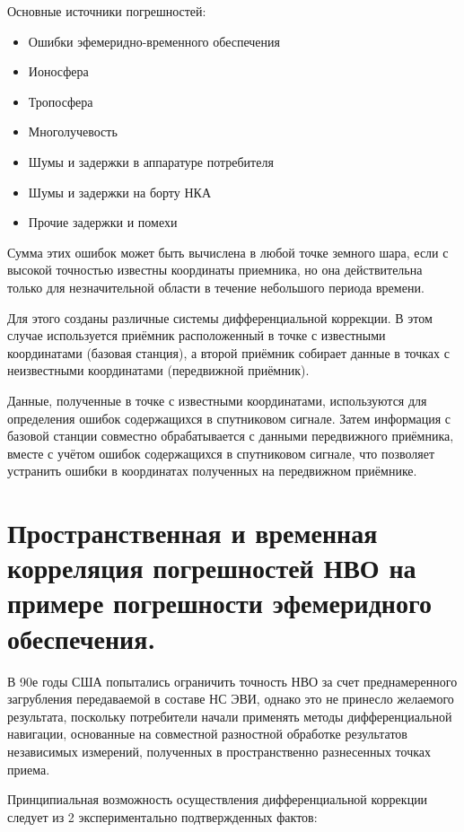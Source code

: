 \documentclass[14pt,a4paper,oneside]{extarticle}
\begin{document}
Основные источники погрешностей:

\begin{itemize}
    \item Ошибки эфемеридно-временного обеспечения
    \item Ионосфера
    \item Тропосфера
    \item Многолучевость
    \item Шумы и задержки в аппаратуре потребителя
    \item Шумы и задержки на борту НКА
    \item Прочие задержки и помехи
\end{itemize}

Сумма этих ошибок может быть вычислена в любой точке земного шара, если с высокой точностью известны координаты приемника, но она действительна только для незначительной области в течение небольшого периода времени.

Для этого созданы различные системы дифференциальной коррекции. В этом случае используется приёмник расположенный в точке с известными координатами (базовая станция), а второй приёмник собирает данные в точках с неизвестными координатами (передвижной приёмник).

Данные, полученные в точке с известными координатами, используются для определения ошибок содержащихся в спутниковом сигнале. Затем информация с базовой станции совместно обрабатывается с данными передвижного приёмника, вместе с учётом ошибок содержащихся в спутниковом сигнале, что позволяет устранить ошибки в координатах полученных на передвижном приёмнике.

\section{Пространственная и временная корреляция погрешностей НВО на примере погрешности эфемеридного обеспечения.}

В 90е годы США попытались ограничить точность НВО за счет преднамеренного загрубления передаваемой в составе НС ЭВИ, однако это не принесло желаемого результата, поскольку потребители начали применять методы дифференциальной навигации, основанные на совместной разностной обработке результатов независимых измерений, полученных в пространственно разнесенных точках приема.

Принципиальная возможность осуществления дифференциальной коррекции следует из 2 экспериментально подтвержденных фактов:
\end{document}
